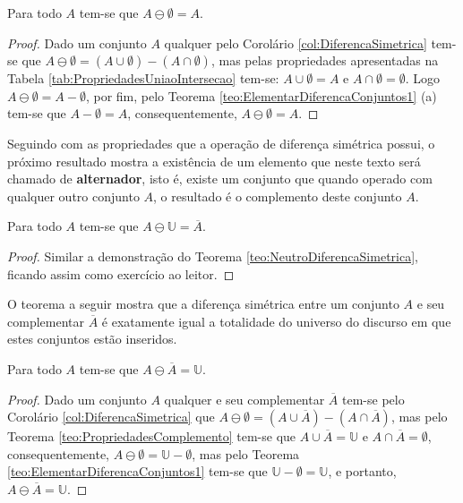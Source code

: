 \begin{teorema}\label{teo:NeutroDiferencaSimetrica}
	Para todo $A$ tem-se que $A \ominus \emptyset = A$.
\end{teorema}

\begin{proof}
	Dado um conjunto $A$ qualquer pelo Corolário \ref{col:DiferencaSimetrica} tem-se que $A \ominus \emptyset = (A \cup \emptyset) - (A \cap \emptyset)$, mas pelas propriedades apresentadas na Tabela \ref{tab:PropriedadesUniaoIntersecao} tem-se: $A \cup \emptyset = A$ e $A \cap \emptyset = \emptyset$. Logo $A \ominus \emptyset = A - \emptyset$, por fim, pelo Teorema \ref{teo:ElementarDiferencaConjuntos1} (a) tem-se que $A - \emptyset = A$, consequentemente, $A \ominus \emptyset = A$.
\end{proof}

Seguindo com as propriedades que a operação de diferença simétrica possui, o próximo resultado mostra a existência de um elemento que neste texto será chamado de \textbf{alternador}, isto é, existe um conjunto que quando operado com qualquer outro conjunto $A$, o resultado é o complemento deste conjunto $A$.

\begin{teorema}\label{teo:InversorDiferencaSimetrica}
	Para todo $A$ tem-se que $A \ominus \mathbb{U} = \overline{A}$.
\end{teorema}

\begin{proof}
	Similar a demonstração do Teorema \ref{teo:NeutroDiferencaSimetrica}, ficando assim como exercício ao leitor.
\end{proof}

O teorema a seguir mostra que a diferença simétrica entre um conjunto $A$ e seu complementar $\overline{A}$ é exatamente igual a totalidade do universo do discurso em que estes conjuntos estão inseridos.

\begin{teorema}
  Para todo $A$ tem-se que $A \ominus \overline{A} = \mathbb{U}$.
\end{teorema}

\begin{proof}
	Dado um conjunto $A$ qualquer e seu complementar $\overline{A}$ tem-se pelo Corolário \ref{col:DiferencaSimetrica}  que 	$A \ominus \emptyset = (A \cup \overline{A}) - (A \cap \overline{A})$, mas pelo Teorema \ref{teo:PropriedadesComplemento} tem-se que $A \cup \overline{A} = \mathbb{U}$ e $A \cap \overline{A} = \emptyset$, consequentemente,  $A \ominus \emptyset = \mathbb{U} -  \emptyset$, mas pelo Teorema \ref{teo:ElementarDiferencaConjuntos1} tem-se que $\mathbb{U} -  \emptyset = \mathbb{U}$, e portanto, $A \ominus \overline{A} = \mathbb{U}$.
\end{proof}

